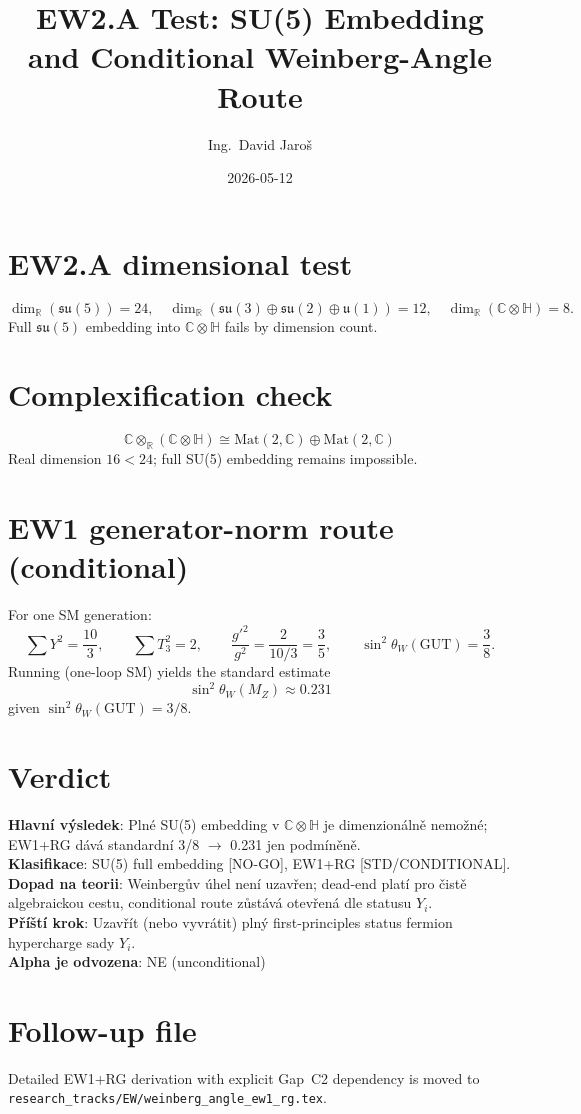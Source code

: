 \documentclass[12pt,a4paper]{article}
\title{EW2.A Test: SU(5) Embedding and Conditional Weinberg-Angle Route}
\author{Ing.\ David Jaroš}
\date{2026-05-12}
\begin{document}
\maketitle

\section*{EW2.A dimensional test}
\[
\dim_{\mathbb R}(\mathfrak{su}(5))=24,
\quad
\dim_{\mathbb R}(\mathfrak{su}(3)\oplus\mathfrak{su}(2)\oplus\mathfrak{u}(1))=12,
\quad
\dim_{\mathbb R}(\mathbb C\otimes\mathbb H)=8.
\]
Full $\mathfrak{su}(5)$ embedding into $\mathbb C\otimes\mathbb H$ fails by dimension count.

\section*{Complexification check}
\[
\mathbb C\otimes_{\mathbb R}(\mathbb C\otimes\mathbb H)
\cong \mathrm{Mat}(2,\mathbb C)\oplus \mathrm{Mat}(2,\mathbb C)
\]
Real dimension $16<24$; full SU(5) embedding remains impossible.

\section*{EW1 generator-norm route (conditional)}
For one SM generation:
\[
\sum Y^2=\frac{10}{3},\qquad \sum T_3^2=2,
\qquad \frac{g'^2}{g^2}=\frac{2}{10/3}=\frac35,
\qquad \sin^2\theta_W(\mathrm{GUT})=\frac38.
\]
Running (one-loop SM) yields the standard estimate
\[
\sin^2\theta_W(M_Z)\approx 0.231
\]
given $\sin^2\theta_W(\mathrm{GUT})=3/8$.

\section*{Verdict}
\begin{statusbox}
\textbf{Hlavní výsledek}: Plné SU(5) embedding v $\mathbb C\otimes\mathbb H$ je dimenzionálně nemožné; EW1+RG dává standardní 3/8 $\to$ 0.231 jen podmíněně.\\
\textbf{Klasifikace}: SU(5) full embedding [NO-GO], EW1+RG [STD/CONDITIONAL].\\
\textbf{Dopad na teorii}: Weinbergův úhel není uzavřen; dead-end platí pro čistě algebraickou cestu, conditional route zůstává otevřená dle statusu $Y_i$.\\
\textbf{Příští krok}: Uzavřít (nebo vyvrátit) plný first-principles status fermion hypercharge sady $Y_i$.\\
\textbf{Alpha je odvozena}: NE (unconditional)
\end{statusbox}

\section*{Follow-up file}
Detailed EW1+RG derivation with explicit Gap~C2 dependency is moved to
\texttt{research\_tracks/EW/weinberg\_angle\_ew1\_rg.tex}.
\end{document}

